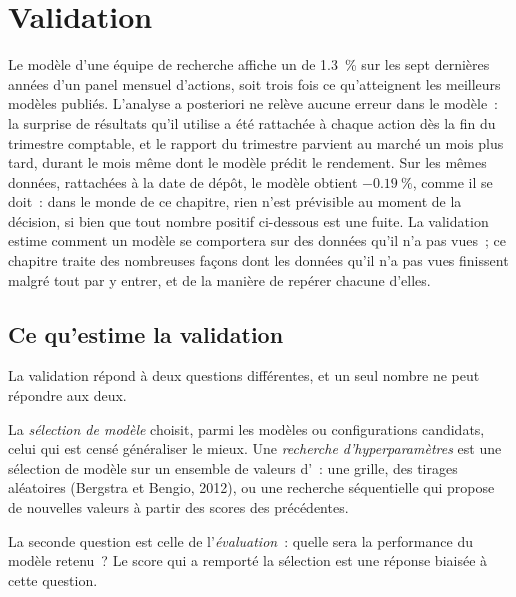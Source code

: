 \chapter{Validation}\label{ch:ml:validation}

Le modèle d'une équipe de recherche affiche un  de 1.3~\% sur les sept dernières années d'un panel mensuel d'actions,
soit trois fois ce qu'atteignent les meilleurs modèles publiés. L'analyse a posteriori ne relève aucune erreur dans le modèle~: la
surprise de résultats qu'il utilise a été rattachée à chaque action dès la fin du trimestre comptable, et le rapport du trimestre parvient au marché
un mois plus tard, durant le mois même dont le modèle prédit le rendement. Sur les mêmes données, rattachées à la date de dépôt, le modèle
obtient $-0.19~\%$, comme il se doit~: dans le monde de ce chapitre, rien n'est prévisible au moment de la décision, si bien que tout
nombre positif ci-dessous est une fuite. La validation estime comment un modèle se comportera sur des données qu'il n'a pas vues~; ce chapitre
traite des nombreuses façons dont les données qu'il n'a pas vues finissent malgré tout par y entrer, et de la manière de repérer chacune d'elles.

\section{Ce qu'estime la validation}

La validation répond à deux questions différentes, et un seul nombre ne peut répondre aux deux.

\begin{definition}\label{def:ml:validation:selection}
La \emph{sélection de modèle} choisit, parmi les modèles ou configurations candidats, celui qui est censé
généraliser le mieux. Une \emph{recherche d'hyperparamètres} est une sélection de modèle sur un ensemble de
valeurs d'~: une grille, des tirages aléatoires (Bergstra et Bengio, 2012), ou une recherche séquentielle qui propose de nouvelles
valeurs à partir des scores des précédentes.
\end{definition}

La seconde question est celle de l'\emph{évaluation}~: quelle sera la performance du modèle retenu~? Le score qui a remporté la sélection est une
réponse biaisée à cette question.

